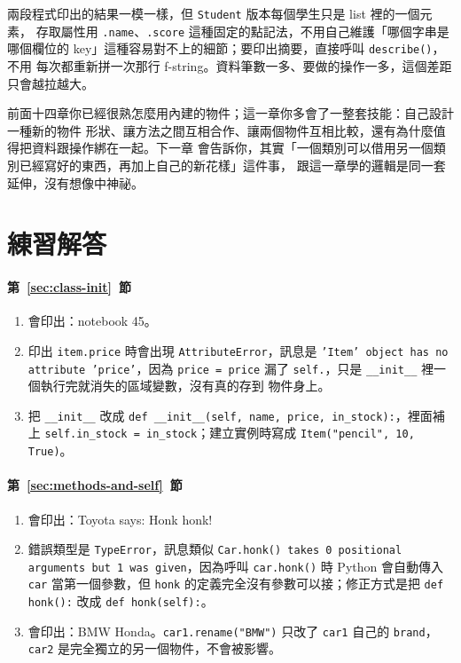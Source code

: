 兩段程式印出的結果一模一樣，但 \texttt{Student} 版本每個學生只是 list 裡的一個元素，
存取屬性用 \texttt{.name}、\texttt{.score} 這種固定的點記法，不用自己維護「哪個字串是
哪個欄位的 key」這種容易對不上的細節；要印出摘要，直接呼叫 \texttt{describe()}，不用
每次都重新拼一次那行 f-string。資料筆數一多、要做的操作一多，這個差距只會越拉越大。


前面十四章你已經很熟怎麼用內建的物件；這一章你多會了一整套技能：自己設計一種新的物件
形狀、讓方法之間互相合作、讓兩個物件互相比較，還有為什麼值得把資料跟操作綁在一起。下一章
會告訴你，其實「一個類別可以借用另一個類別已經寫好的東西，再加上自己的新花樣」這件事，
跟這一章學的邏輯是同一套延伸，沒有想像中神祕。

\section*{練習解答}

\paragraph{第~\ref{sec:class-init}~節}
\begin{enumerate}
\item 會印出：notebook 45。
\item 印出 \texttt{item.price} 時會出現 \texttt{AttributeError}，訊息是
\texttt{'Item' object has no attribute 'price'}，因為 \texttt{price = price} 漏了
\texttt{self.}，只是 \texttt{\_\_init\_\_} 裡一個執行完就消失的區域變數，沒有真的存到
物件身上。
\item 把 \texttt{\_\_init\_\_} 改成
\texttt{def \_\_init\_\_(self, name, price, in\_stock):}，裡面補上
\texttt{self.in\_stock = in\_stock}；建立實例時寫成
\texttt{Item("pencil", 10, True)}。
\end{enumerate}

\paragraph{第~\ref{sec:methods-and-self}~節}
\begin{enumerate}
\item 會印出：Toyota says: Honk honk!
\item 錯誤類型是 \texttt{TypeError}，訊息類似
\texttt{Car.honk() takes 0 positional arguments but 1 was given}，因為呼叫
\texttt{car.honk()} 時 Python 會自動傳入 \texttt{car} 當第一個參數，但
\texttt{honk} 的定義完全沒有參數可以接；修正方式是把 \texttt{def honk():} 改成
\texttt{def honk(self):}。
\item 會印出：BMW Honda。\texttt{car1.rename("BMW")} 只改了 \texttt{car1} 自己的
\texttt{brand}，\texttt{car2} 是完全獨立的另一個物件，不會被影響。
\end{enumerate}

